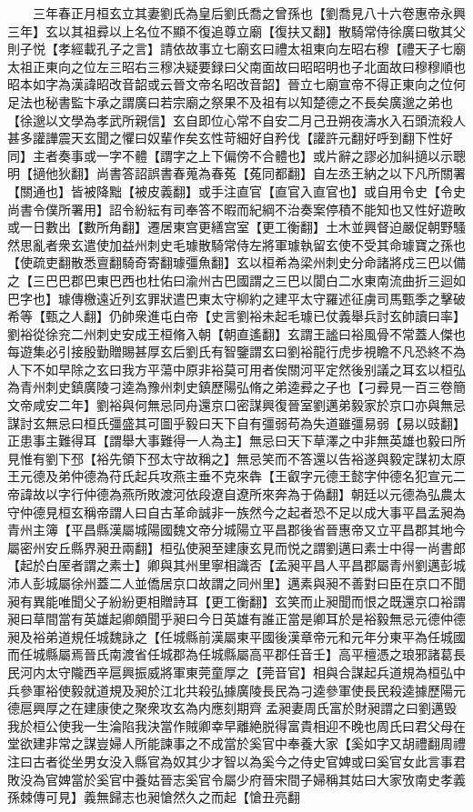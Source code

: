 　　三年春正月桓玄立其妻劉氏為皇后劉氏喬之曾孫也【劉喬見八十六卷惠帝永興三年】玄以其祖彛以上名位不顯不復追尊立廟【復扶又翻】散騎常侍徐廣曰敬其父則子悦【孝經載孔子之言】請依故事立七廟玄曰禮太祖東向左昭右穆【禮天子七廟太祖正東向之位左三昭右三穆决疑要録曰父南面故曰昭昭明也子北面故曰穆穆順也昭本如字為漢諱昭改音韶或云晉文帝名昭改音韶】晉立七廟宣帝不得正東向之位何足法也秘書監卞承之謂廣曰若宗廟之祭果不及祖有以知楚德之不長矣廣邈之弟也【徐邈以文學為孝武所親信】玄自即位心常不自安二月己丑朔夜濤水入石頭流殺人甚多讙譁震天玄聞之懼曰奴輩作矣玄性苛細好自矜伐【讙許元翻好呼到翻下性好同】主者奏事或一字不體【謂字之上下偏傍不合體也】或片辭之謬必加糾擿以示聰明【擿他狄翻】尚書答詔誤書春蒐為春菟【菟同都翻】自左丞王納之以下凡所關署【關通也】皆被降黜【被皮義翻】或手注直官【直官入直官也】或自用令史【令史尚書令僕所署用】詔令紛紜有司奉答不暇而紀綱不治奏案停積不能知也又性好遊畋或一日數出【數所角翻】遷居東宫更繕宫室【更工衡翻】土木並興督迫嚴促朝野騷然思亂者衆玄遣使加益州刺史毛璩散騎常侍左將軍璩執留玄使不受其命璩寶之孫也【使疏吏翻散悉亶翻騎奇寄翻璩彊魚翻】玄以桓希為梁州刺史分命諸將戍三巴以備之【三巴巴郡巴東巴西也杜佑曰渝州古巴國謂之三巴以閬白二水東南流曲折三迴如巴字也】璩傳檄遠近列玄罪狀遣巴東太守柳約之建平太守羅述征虜司馬甄季之擊破希等【甄之人翻】仍帥衆進屯白帝【史言劉裕未起毛璩已仗義舉兵討玄帥讀曰率】劉裕從徐兖二州刺史安成王桓脩入朝【朝直遙翻】玄謂王謐曰裕風骨不常蓋人傑也每遊集必引接殷勤贈賜甚厚玄后劉氏有智鑒謂玄曰劉裕龍行虎步視瞻不凡恐終不為人下不如早除之玄曰我方平蕩中原非裕莫可用者俟關河平定然後别議之耳玄以桓弘為青州刺史鎮廣陵刁逵為豫州刺史鎮歷陽弘脩之弟逵彛之子也【刁彛見一百三卷簡文帝咸安二年】劉裕與何無忌同舟還京口密謀興復晉室劉邁弟毅家於京口亦與無忌謀討玄無忌曰桓氏彊盛其可圖乎毅曰天下自有彊弱苟為失道雖彊易弱【易以豉翻】正患事主難得耳【謂舉大事難得一人為主】無忌曰天下草澤之中非無英雄也毅曰所見惟有劉下邳【裕先領下邳太守故稱之】無忌笑而不答還以告裕遂與毅定謀初太原王元德及弟仲德為苻氏起兵攻燕主垂不克來犇【王叡字元德王懿字仲德名犯宣元二帝諱故以字行仲德為燕所敗渡河依段遼自遼所來奔為于偽翻】朝廷以元德為弘農太守仲德見桓玄稱帝謂人曰自古革命誠非一族然今之起者恐不足以成大事平昌孟昶為青州主簿【平昌縣漢屬城陽國魏文帝分城陽立平昌郡後省晉惠帝又立平昌郡其地今屬密州安丘縣界昶丑兩翻】桓弘使昶至建康玄見而悦之謂劉邁曰素士中得一尚書郎【起於白厔者謂之素士】卿與其州里寧相識否【孟昶平昌人平昌郡屬青州劉邁彭城沛人彭城屬徐州蓋二人並僑居京口故謂之同州里】邁素與昶不善對曰臣在京口不聞昶有異能唯聞父子紛紛更相贈詩耳【更工衡翻】玄笑而止昶聞而恨之既還京口裕謂昶曰草間當有英雄起卿頗聞乎昶曰今日英雄有誰正當是卿耳於是裕毅無忌元德仲德昶及裕弟道規任城魏詠之【任城縣前漢屬東平國後漢章帝元和元年分東平為任城國而任城縣屬焉晉氏南渡省任城郡為任城縣屬高平郡任音壬】高平檀憑之琅邪諸葛長民河内太守隴西辛扈興振威將軍東莞童厚之【莞音官】相與合謀起兵道規為桓弘中兵參軍裕使毅就道規及昶於江北共殺弘據廣陵長民為刁逵參軍使長民殺逵據歷陽元德扈興厚之在建康使之聚衆攻玄為内應刻期齊孟昶妻周氏富於財昶謂之曰劉邁毁我於桓公使我一生淪陷我決當作賊卿幸早離絶脱得富貴相迎不晚也周氏曰君父母在堂欲建非常之謀豈婦人所能諫事之不成當於奚官中奉養大家【奚如字又胡禮翻周禮注曰古者從坐男女没入縣官為奴其少才智以為奚今之侍史官婢或曰奚官女此言事君敗没為官婢當於奚官中養姑晉志奚官令屬少府晉宋間子婦稱其姑曰大家攷南史孝義孫棘傳可見】義無歸志也昶愴然久之而起【愴丑亮翻